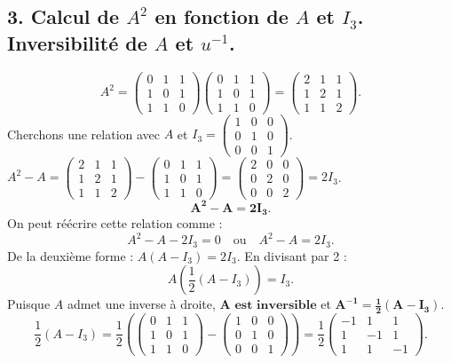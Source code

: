 \documentclass[french]{yLectureNote}
\begin{document}
\subsection*{3. Calcul de $A^2$ en fonction de $A$ et $I_3$. Inversibilité de $A$ et $u^{-1}$.}
$$A^2 = \begin{pmatrix} 0 & 1 & 1 \\ 1 & 0 & 1 \\ 1 & 1 & 0 \end{pmatrix} \begin{pmatrix} 0 & 1 & 1 \\ 1 & 0 & 1 \\ 1 & 1 & 0 \end{pmatrix} = \begin{pmatrix} 2 & 1 & 1 \\ 1 & 2 & 1 \\ 1 & 1 & 2 \end{pmatrix}.$$
Cherchons une relation avec $A$ et $I_3 = \begin{pmatrix} 1 & 0 & 0 \\ 0 & 1 & 0 \\ 0 & 0 & 1 \end{pmatrix}$.
$A^2 - A = \begin{pmatrix} 2 & 1 & 1 \\ 1 & 2 & 1 \\ 1 & 1 & 2 \end{pmatrix} - \begin{pmatrix} 0 & 1 & 1 \\ 1 & 0 & 1 \\ 1 & 1 & 0 \end{pmatrix} = \begin{pmatrix} 2 & 0 & 0 \\ 0 & 2 & 0 \\ 0 & 0 & 2 \end{pmatrix} = 2 I_3$.
$$\mathbf{A^2 - A = 2 I_3}.$$
On peut réécrire cette relation comme :
$$A^2 - A - 2 I_3 = 0 \quad \text{ou} \quad A^2 - A = 2 I_3.$$
De la deuxième forme : $A(A - I_3) = 2 I_3$. En divisant par 2 :
$$A \left( \frac{1}{2} (A - I_3) \right) = I_3.$$
Puisque $A$ admet une inverse à droite, $\mathbf{A \text{ est inversible}}$ et $\mathbf{A^{-1} = \frac{1}{2} (A - I_3)}$.
$$\frac{1}{2} (A - I_3) = \frac{1}{2} \left( \begin{pmatrix} 0 & 1 & 1 \\ 1 & 0 & 1 \\ 1 & 1 & 0 \end{pmatrix} - \begin{pmatrix} 1 & 0 & 0 \\ 0 & 1 & 0 \\ 0 & 0 & 1 \end{pmatrix} \right) = \frac{1}{2} \begin{pmatrix} -1 & 1 & 1 \\ 1 & -1 & 1 \\ 1 & 1 & -1 \end{pmatrix}.$$
\end{document}
